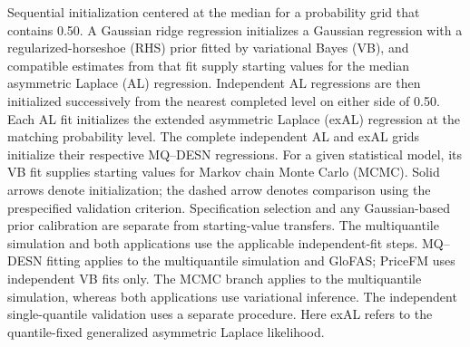 Sequential initialization centered at the median for a probability grid that
contains 0.50. A Gaussian ridge regression initializes a Gaussian regression
with a regularized-horseshoe (RHS) prior fitted by variational Bayes (VB), and
compatible estimates from that fit supply starting values for the median
asymmetric Laplace (AL) regression. Independent AL regressions are then
initialized successively
from the nearest completed level on either side of 0.50. Each AL fit initializes
the extended asymmetric Laplace (exAL) regression at the matching probability
level. The complete independent AL and exAL grids initialize their respective
MQ--DESN regressions. For a given statistical model, its VB fit
supplies starting
values for Markov chain Monte Carlo (MCMC). Solid arrows denote initialization;
the dashed arrow denotes comparison using the prespecified validation
criterion. Specification selection and any Gaussian-based prior calibration
are separate from starting-value transfers. The multiquantile simulation and
both applications use the applicable independent-fit steps. MQ--DESN fitting
applies to the multiquantile simulation and GloFAS; PriceFM uses independent
VB fits only. The MCMC branch applies to the multiquantile simulation,
whereas both applications
use variational inference. The independent single-quantile validation uses
a separate procedure. Here
exAL refers to the quantile-fixed generalized asymmetric Laplace
likelihood.
